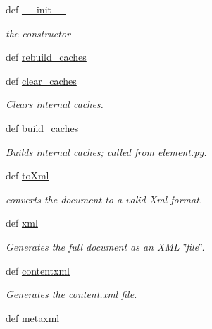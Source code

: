 \begin{DoxyCompactItemize}
\item 
def \hyperlink{classodf_1_1opendocument_1_1OpenDocument_a8bd5e6fc296f339ecbd70ee4c98dd1f4}{\+\_\+\+\_\+init\+\_\+\+\_\+}
\begin{DoxyCompactList}\small\item\em the constructor \end{DoxyCompactList}\item 
def \hyperlink{classodf_1_1opendocument_1_1OpenDocument_a764f9c380d99c1b23d0e260f4aea1093}{rebuild\+\_\+caches}
\item 
def \hyperlink{classodf_1_1opendocument_1_1OpenDocument_a0d37516c2a7ef2e4e8c09598ce28c412}{clear\+\_\+caches}
\begin{DoxyCompactList}\small\item\em Clears internal caches. \end{DoxyCompactList}\item 
def \hyperlink{classodf_1_1opendocument_1_1OpenDocument_a6d6f5670a14b76be97b2f2b19253639a}{build\+\_\+caches}
\begin{DoxyCompactList}\small\item\em Builds internal caches; called from \hyperlink{element_8py}{element.\+py}. \end{DoxyCompactList}\item 
def \hyperlink{classodf_1_1opendocument_1_1OpenDocument_a5805f14a3e0c926dfa4306cdaed94f7b}{to\+Xml}
\begin{DoxyCompactList}\small\item\em converts the document to a valid Xml format. \end{DoxyCompactList}\item 
def \hyperlink{classodf_1_1opendocument_1_1OpenDocument_a88f8f4399b1364970b449e27b9e12638}{xml}
\begin{DoxyCompactList}\small\item\em Generates the full document as an X\+M\+L \char`\"{}file\char`\"{}. \end{DoxyCompactList}\item 
def \hyperlink{classodf_1_1opendocument_1_1OpenDocument_a9d10a57d4766c3a9568ad75343061ae8}{contentxml}
\begin{DoxyCompactList}\small\item\em Generates the content.\+xml file. \end{DoxyCompactList}\item 
def \hyperlink{classodf_1_1opendocument_1_1OpenDocument_a31947bcd1577d114e5c3b7112df1cee5}{metaxml}

\end{DoxyCompactItemize}
